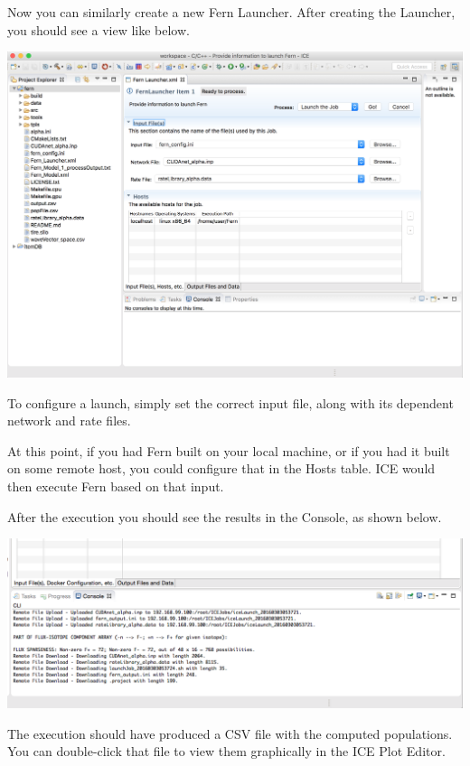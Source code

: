 Now you can similarly create a new Fern Launcher. After creating the Launcher,
you should see a view like below. 
\begin{center} \includegraphics[width=\textwidth]{figures/launcher}
\end{center}
To configure a launch, simply set the correct
input file, along with its dependent network and rate files. 

At this point, if you had Fern built on your local machine, or if you had it
built on some remote host, you could configure that in the Hosts table. ICE
would then execute Fern based on that input. 

After the execution you should see the results in the Console, as shown below.
\begin{center} \includegraphics[width=\textwidth]{figures/launcherResult}
\end{center}
The execution should have produced a CSV file with the computed populations. You
can double-click that file to view them graphically in the ICE Plot Editor. 
